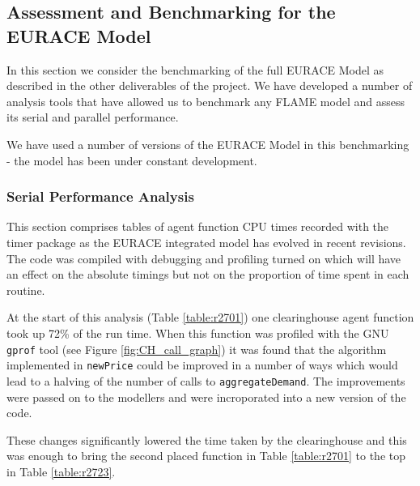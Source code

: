 \subsection{Assessment and Benchmarking for the EURACE Model}
\label{sec:benchmarks}
In this section we consider the benchmarking of the full EURACE Model as
described in the other deliverables of the project. We have developed a
number of analysis tools that have allowed us to benchmark any
FLAME model and assess its serial and parallel performance.

We have used a number of versions of the EURACE Model in this benchmarking - the model
has been under constant development.

\subsubsection{Serial Performance Analysis}

This section comprises tables of agent function CPU times recorded with the timer package as the EURACE integrated model has evolved in recent revisions. The code was compiled with debugging and profiling turned on which will have an effect on the absolute timings but not on the proportion of time spent in each routine. 

At the start of this analysis (Table \ref{table:r2701}) one clearinghouse agent function took up 72\% of the run time. When this function was profiled with the GNU \texttt{gprof} tool (see Figure \ref{fig:CH_call_graph}) it was found that the algorithm implemented in \texttt{newPrice} could be improved in a number of ways which would lead to a halving of the number of calls to \texttt{aggregateDemand}.  The improvements were passed on to the modellers and were incroporated into a new version of the code. 

These changes significantly lowered the time taken by the clearinghouse and this was enough to bring the second placed function in Table \ref{table:r2701} to the top in Table \ref{table:r2723}.

